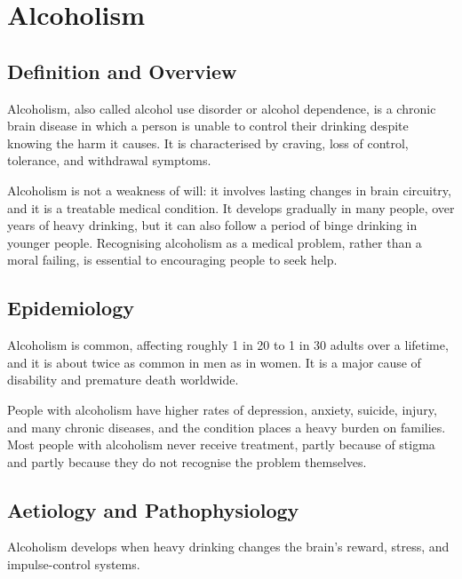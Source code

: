 \chapter{Alcoholism}

\section*{Definition and Overview}
Alcoholism, also called alcohol use disorder or alcohol dependence, is a chronic brain disease in which a person is unable to control their drinking despite knowing the harm it causes. It is characterised by craving, loss of control, tolerance, and withdrawal symptoms.

Alcoholism is not a weakness of will: it involves lasting changes in brain circuitry, and it is a treatable medical condition. It develops gradually in many people, over years of heavy drinking, but it can also follow a period of binge drinking in younger people. Recognising alcoholism as a medical problem, rather than a moral failing, is essential to encouraging people to seek help.

\section*{Epidemiology}
Alcoholism is common, affecting roughly 1 in 20 to 1 in 30 adults over a lifetime, and it is about twice as common in men as in women. It is a major cause of disability and premature death worldwide.

People with alcoholism have higher rates of depression, anxiety, suicide, injury, and many chronic diseases, and the condition places a heavy burden on families. Most people with alcoholism never receive treatment, partly because of stigma and partly because they do not recognise the problem themselves.

\section*{Aetiology and Pathophysiology}
Alcoholism develops when heavy drinking changes the brain's reward, stress, and impulse-control systems.

